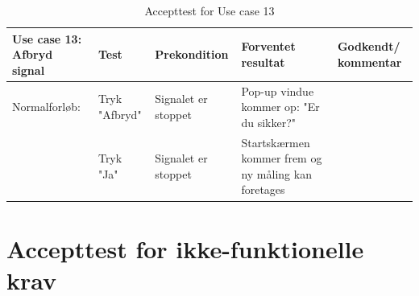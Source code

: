 \begin{table}[H]
\caption{Accepttest for Use case 13}\label{tab:tabel8}
\begin{tabular}{|>{\raggedright\arraybackslash}p{2.5cm}| >{\raggedright\arraybackslash}p{2.9cm} | >{\raggedright\arraybackslash}p{2.9cm} | >{\raggedright\arraybackslash}p{2.9cm} | >{\raggedright\arraybackslash}p{2.8cm} |}
   \hline
   \textbf{Use case 13: Afbryd signal } &\textbf{Test}& \textbf{Prekondition} & \textbf{Forventet resultat} & \textbf{Godkendt/ kommentar}\\ \hline
   Normalforløb:& Tryk "Afbryd" & Signalet er stoppet & Pop-up vindue kommer op: "Er du sikker?" &\\\hline
   &Tryk "Ja"&Signalet er stoppet& Startskærmen kommer frem og ny måling kan foretages &\\\hline
\end{tabular}
\end{table}



\newpage

\newpage

\newpage

\section{Accepttest for ikke-funktionelle krav}


